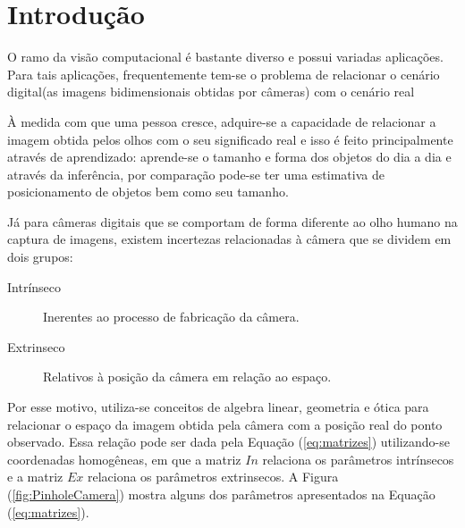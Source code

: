 \section{Introdução}
\label{sec:intro}




O ramo da visão computacional é bastante diverso e possui variadas aplicações. Para tais aplicações, frequentemente tem-se o problema de relacionar o cenário digital(as imagens bidimensionais obtidas por câmeras) com o cenário real%

À medida com que uma pessoa cresce, adquire-se a capacidade de relacionar a imagem obtida pelos olhos com o seu significado real e isso é feito principalmente através de aprendizado: aprende-se o tamanho e forma dos objetos do dia a dia e através da inferência, por comparação pode-se ter uma estimativa de posicionamento de objetos bem como seu tamanho.

Já para câmeras digitais que se comportam de forma diferente ao olho humano na captura de imagens, existem incertezas relacionadas à câmera que se dividem em dois grupos:

\begin{description}
\item[Intrínseco] Inerentes ao processo de fabricação da câmera.%
\item[Extrinseco] Relativos à posição da câmera em relação ao espaço.%
\end{description}

Por esse motivo, utiliza-se conceitos de algebra linear, geometria e ótica para relacionar o espaço da imagem obtida pela câmera com a posição real do ponto observado. Essa relação pode ser dada pela Equação (\ref{eq:matrizes}) utilizando-se coordenadas homogêneas, em que a matriz $In$ relaciona os parâmetros intrínsecos e a matriz $Ex$ relaciona os parâmetros extrinsecos. A Figura (\ref{fig:PinholeCamera}) mostra alguns dos parâmetros apresentados na Equação (\ref{eq:matrizes}).

